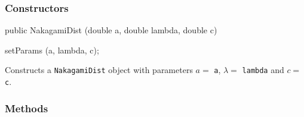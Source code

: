 \subsubsection* {Constructors}

\begin{code}

   public NakagamiDist (double a, double lambda, double c)\begin{hide} {
      setParams (a, lambda, c);
   }\end{hide}
\end{code}
  \begin{tabb}  Constructs a \texttt{NakagamiDist} object with parameters $a =$
   \texttt{a},  $\lambda =$ \texttt{lambda} and $c =$ \texttt{c}.
  \end{tabb}

\subsubsection* {Methods}


